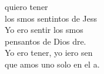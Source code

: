 \begin{cancion}%
	 quiero tener\\
	los smos sentintos de Jess\\
	Yo ero sentir los smos\\
	pensantos de Dios dre.\\
	Yo ero tener, yo iero sen\\
	que amos uno solo en el a.\\
\end{cancion}%

